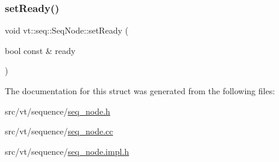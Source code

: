 \mbox{\label{structvt_1_1seq_1_1_seq_node_af12dafb9242411bc072f3889aa7afaae}} 
\subsubsection{\texorpdfstring{set\+Ready()}{setReady()}}
{\footnotesize\ttfamily void vt\+::seq\+::\+Seq\+Node\+::set\+Ready (\begin{DoxyParamCaption}\item[{bool const \&}]{ready }\end{DoxyParamCaption})}



The documentation for this struct was generated from the following files\+:\begin{DoxyCompactItemize}
\item 
src/vt/sequence/\hyperlink{seq__node_8h}{seq\+\_\+node.\+h}\item 
src/vt/sequence/\hyperlink{seq__node_8cc}{seq\+\_\+node.\+cc}\item 
src/vt/sequence/\hyperlink{seq__node_8impl_8h}{seq\+\_\+node.\+impl.\+h}\end{DoxyCompactItemize}
